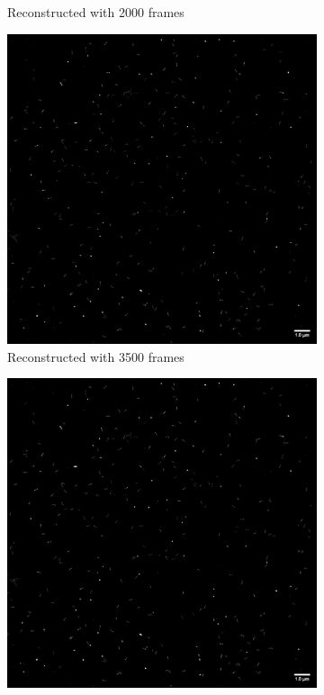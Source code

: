\documentclass[a4paper,english,12pt,bibliography=totoc]{scrreprt}
\begin{document}
\begin{figure}[H]
\begin{subfigure}[b]{0.49\textwidth}
        \caption{Reconstructed with 2000 frames}
        \label{fig:image2}
    \end{subfigure}
    \vfill
    \begin{subfigure}[b]{0.49\textwidth}
        \centering
        \includegraphics[width=\textwidth]{Images/PAINT/3500frames.png}
        \caption{Reconstructed with 3500 frames}
        \label{fig:image3}
    \end{subfigure}
    \hfill
    \begin{subfigure}[b]{0.49\textwidth}
        \centering
        \includegraphics[width=\textwidth]{Images/PAINT/4800frames.png}

\end{subfigure}
\end{figure}
\end{document}

